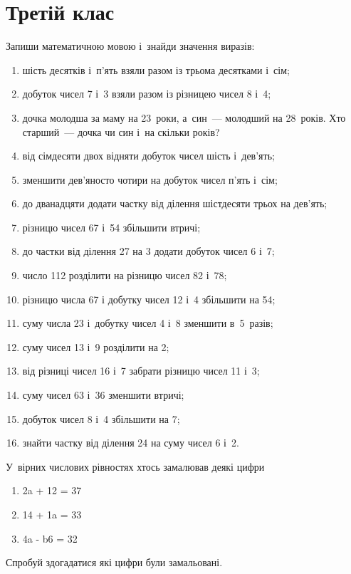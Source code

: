 \chapter{Третій клас}

\problem
Запиши математичною мовою і~знайди значення виразів:
\begin{enumerate}
    \item шість десятків і~п'ять взяли разом із трьома десятками і~сім;
    \item добуток чисел 7 і~3 взяли разом із різницею чисел 8 і~4;
    \item дочка молодша за маму на 23~роки, а~син~--- молодший на 28~років.
    Хто старший~--- дочка чи син і~на скільки років?
    \item від сімдесяти двох відняти добуток чисел шість і~дев'ять;
    \item зменшити дев'яносто чотири на добуток чисел п'ять і~сім;
    \item до дванадцяти додати частку від ділення шістдесяти трьох на дев'ять;
    \item різницю чисел 67 і~54 збільшити втричі;
    \item до частки від ділення 27 на 3 додати добуток чисел 6 і~7;
    \item число 112 розділити на різницю чисел 82 і~78;
    \item різницю числа 67 і добутку чисел 12 і~4 збільшити на 54;
    \item суму числа 23 і~добутку чисел 4 і~8 зменшити в~5~разів;
    \item суму чисел 13 і~9 розділити на 2;
    \item від різниці чисел 16 і~7 забрати різницю чисел 11 і~3;
    \item суму чисел 63 і~36 зменшити втричі;
    \item добуток чисел 8 і~4 збільшити на 7;
    \item знайти частку від ділення 24 на суму чисел 6 і~2.
\end{enumerate}


\problem
У~вірних числових рівностях хтось замалював деякі цифри
\begin{multicols}{2}
    \begin{enumerate}
        \item 2a + 12 = 37
        \item 14 + 1a = 33
        \item 4a - b6 = 32
    \end{enumerate}
\end{multicols}
Спробуй здогадатися які цифри були замальовані.


